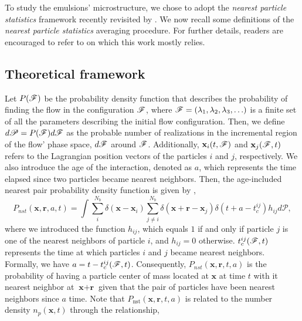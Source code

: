 
To study the emulsions' microstructure, we chose to adopt the \textit{nearest particle statistics} framework recently revisited by \citet{zhang2021ensemble}.
We now recall some definitions of the \textit{nearest particle statistics} averaging procedure. 
For further details, readers are encouraged to refer to \citet{zhang2023evolution} on which this work mostly relies.

\subsection{Theoretical framework}
Let $P(\mathscr{F})$ be the probability density function that describes the probability of finding the flow in the configuration $\mathscr{F}$, where $\mathscr{F} = (\lambda_1,\lambda_2,\lambda_3,\ldots)$ is a finite set of all the parameters describing the initial flow configuration.
Then, we define $d\mathscr{P} = P(\mathscr{F})d\mathscr{F}$ as the probable number of realizations in the incremental region of the flow' phase space, $d\mathscr{F}$ around $\mathscr{F}$.
Additionally,  $\textbf{x}_i(t,\mathscr{F})$ and $\textbf{x}_j(\mathscr{F},t)$ refers to the Lagrangian position vectors of the particles $i$ and $j$, respectively. 
We also introduce the age of the interaction, denoted as $a$, which represents the time elapsed since two particles became nearest neighbors.
Then, the age-included nearest pair probability density function is given by \citep{zhang2021ensemble,zhang2023evolution},
\begin{equation}
    P_{nst}(\textbf{x},\textbf{r},a,t)= 
    \int \sum_{i}^{N_b}\delta(\textbf{x}-\textbf{x}_i)
    \sum_{j\neq i}^{N_b}\delta(\textbf{x}+\textbf{r}-\textbf{x}_j) 
    \delta(t+a-t_c^{ij}) 
    h_{ij} d\mathscr{P},
    \label{eq:P_nstij}
\end{equation}
where we introduced the function $h_{ij}$, which equals $1$ if and only if particle $j$ is one of the nearest neighbors of particle $i$, and $h_{ij} = 0$ otherwise. 
$t_c^{ij}(\mathscr{F},t)$ represents the time at which particles $i$ and $j$ became nearest neighbors. 
Formally, we have $a = t - t^{ij}_c(\mathscr{F},t)$.
Consequently, $P_{nst}(\textbf{x},\textbf{r},t,a)$ is the probability of having a particle center of mass located at $\textbf{x}$ at time $t$ with it nearest neighbor at $\textbf{x}+\textbf{r}$ given that the pair of particles have been nearest neighbors since $a$ time.
Note that $P_\text{nst}(\textbf{x},\textbf{r},t,a)$ is related to the number density $n_p(\textbf{x},t)$ through the relationship, 
